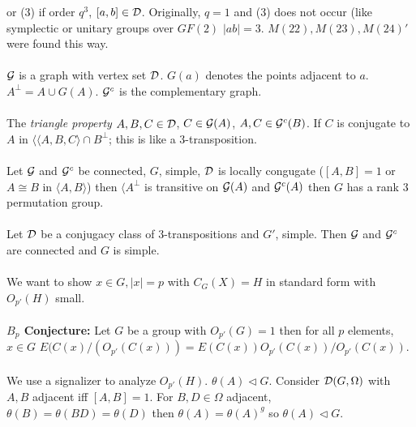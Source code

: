 or (3) if order $q^3$, $[a, b] \in {\cal D}$.  Originally, $q=1$ and (3) does not occur (like symplectic or unitary
groups over $GF(2)$ $|ab|=3$.  $M(22), M(23), M(24)'$ were found this way.
\\
\\
${\cal G}$ is a graph with vertex set ${\cal D}$.  $G(a)$ denotes the points adjacent to $a$.  $A^{\perp} = A \cup G(A)$.
${\cal G}^c$ is the complementary graph.
\\
\\
The \emph{triangle property} $A, B, C \in {\cal D}$, $C \in {\cal G}(A)$, $A, C \in {\cal G}^c(B)$. If $C$ is conjugate
to $A$ in $\langle \langle A, B, C \rangle \cap B^{\perp}$; this is like a $3$-transposition.
\\
\\
Let ${\cal G}$ and ${\cal G}^c$ be connected, $G$, simple, ${\cal D}$ is locally congugate ($[A, B] =1$ or $A \cong B$ in
$\langle A, B \rangle$) then $\langle A^{\perp}$ is transitive on ${\cal G}(A)$ and ${\cal G}^c(A)$ then $G$ has a rank $3$
permutation group.
\\
\\
Let ${\cal D}$ be a conjugacy class of $3$-transpositions and $G'$, simple.  Then ${\cal G}$ and ${\cal G}^c$ are connected
and $G$ is simple.
\\
\\
We want to show $x \in G, |x|=p$ with $C_G(X) = H$ in standard form with $O_{p'}(H)$ small.
\\
\\
{\bf $B_p$ Conjecture:} Let $G$ be a group with $O_{p'}(G)=1$ then for all $p$ elements, $x \in G$
$E(C(x)/(O_{p'}(C(x))) = E(C(x)) O_{p'}(C(x))/O_{p'}(C(x))$.
\\
\\
We use a signalizer to analyze $O_{p'}(H)$.  $\theta(A) \lhd G$.  Consider ${\cal D}(G, \Omega)$ with $A, B$ adjacent
iff $[A, B] = 1$.  For $B, D \in \Omega$ adjacent, $\theta(B)=\theta(BD)=\theta(D)$ then $\theta(A) = \theta(A)^g$ so
$\theta(A) \lhd G$.

